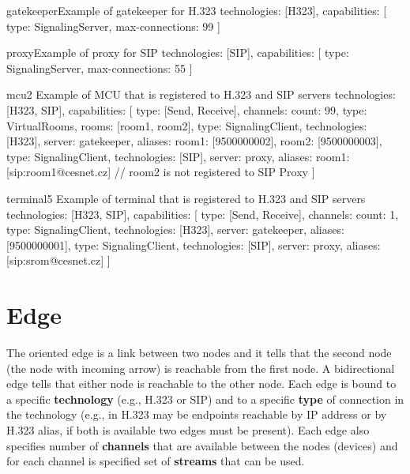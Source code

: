 \begin{itemize}
\begin{TopologyExample}{gatekeeper}{Example of gatekeeper for H.323}
technologies: [H323],
capabilities: [
  {type: SignalingServer, max-connections: 99}
]
\end{TopologyExample}

\begin{TopologyExample}{proxy}{Example of proxy for SIP}
technologies: [SIP],
capabilities: [
  {type: SignalingServer, max-connections: 55}
]
\end{TopologyExample}

\begin{TopologyExample}{mcu2}%
      {Example of MCU that is registered to H.323 and SIP servers}
technologies: [H323, SIP],
capabilities: [
  {type: [Send, Receive], channels: {count: 99}},
  {type: VirtualRooms, rooms: [room1, room2]},
  {type: SignalingClient, technologies: [H323], server: gatekeeper,
     aliases: {room1: [9500000002], room2: [9500000003]}},
  {type: SignalingClient, technologies: [SIP], server: proxy,
     aliases: {room1: [sip:room1@cesnet.cz]}} 
     // room2 is not registered to SIP Proxy
]
\end{TopologyExample}

\begin{TopologyExample}{terminal5}%
      {Example of terminal that is registered to H.323 and SIP servers}
technologies: [H323, SIP],
capabilities: [
  {type: [Send, Receive], channels: {count: 1}},
  {type: SignalingClient, technologies: [H323], server: gatekeeper,
     aliases: [9500000001]},
  {type: SignalingClient, technologies: [SIP], server: proxy,
     aliases: [sip:srom@cesnet.cz]}
]
\end{TopologyExample}

\end{itemize}
 

\section{Edge}

The oriented edge is a link between two nodes and it tells that the second 
node (the node with incoming arrow) is reachable from the first node. A 
bidirectional edge tells that either node is reachable to the other node. 
Each edge is bound to a specific \textbf{technology} (e.g., H.323 or SIP) and 
to a specific \textbf{type} of connection in the technology (e.g., in H.323 
may be endpoints reachable by IP address or by H.323 alias, if both is 
available two edges must be present). Each edge also specifies number of 
\textbf{channels} that are available between the nodes (devices) and for each 
channel is specified set of \textbf{streams} that can be used.

